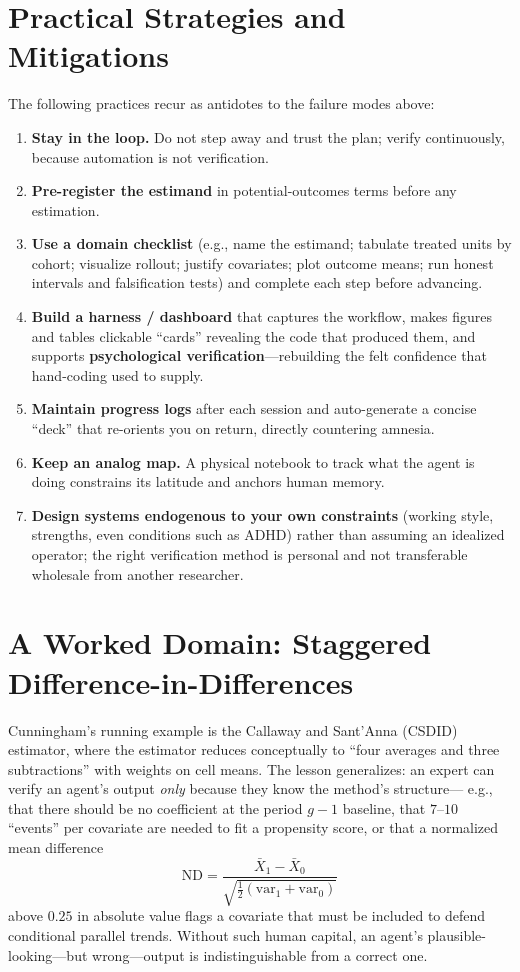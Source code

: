 \documentclass[11pt]{article}
\newcommand{\concept}[1]{\textbf{#1}}
\begin{document}
\section{Practical Strategies and Mitigations}
The following practices recur as antidotes to the failure modes above:
\begin{enumerate}[leftmargin=1.5em,itemsep=3pt]
  \item \concept{Stay in the loop.} Do not step away and trust the plan; verify
    continuously, because automation is not verification.
  \item \concept{Pre-register the estimand} in potential-outcomes terms before
    any estimation.
  \item \concept{Use a domain checklist} (e.g., name the estimand; tabulate
    treated units by cohort; visualize rollout; justify covariates; plot outcome
    means; run honest intervals and falsification tests) and complete each step
    before advancing.
  \item \concept{Build a harness / dashboard} that captures the workflow, makes
    figures and tables clickable ``cards'' revealing the code that produced
    them, and supports \concept{psychological verification}---rebuilding the felt
    confidence that hand-coding used to supply.
  \item \concept{Maintain progress logs} after each session and auto-generate a
    concise ``deck'' that re-orients you on return, directly countering amnesia.
  \item \concept{Keep an analog map.} A physical notebook to track what the agent
    is doing constrains its latitude and anchors human memory.
  \item \concept{Design systems endogenous to your own constraints} (working
    style, strengths, even conditions such as ADHD) rather than assuming an
    idealized operator; the right verification method is personal and not
    transferable wholesale from another researcher.
\end{enumerate}

\section{A Worked Domain: Staggered Difference-in-Differences}
Cunningham's running example is the Callaway and Sant'Anna (CSDID) estimator,
where the estimator reduces conceptually to ``four averages and three
subtractions'' with weights on cell means. The lesson generalizes: an expert can
verify an agent's output \emph{only} because they know the method's structure---
e.g., that there should be no coefficient at the period $g-1$ baseline, that
$7$--$10$ ``events'' per covariate are needed to fit a propensity score, or that
a normalized mean difference
\[
  \mathrm{ND} = \frac{\bar X_1 - \bar X_0}{\sqrt{\tfrac{1}{2}\left(\mathrm{var}_1 + \mathrm{var}_0\right)}}
\]
above $0.25$ in absolute value flags a covariate that must be included to defend
conditional parallel trends. Without such human capital, an agent's plausible-
looking---but wrong---output is indistinguishable from a correct one.
\end{document}
